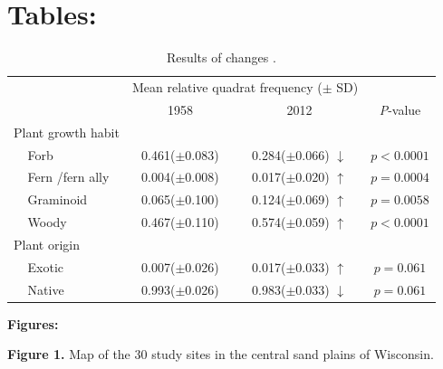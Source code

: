 \clearpage{}
\section*{Tables:}
\vspace{60pt}

\begin{table}[h]
\begin{centering}
\doublespacing\caption{\label{tab:changes-in-rel-frequency}Results of changes .\protect \\
}
\par\end{centering}

\centering{}\doublespacing%
\begin{tabular*}{1\textwidth}{@{\extracolsep{\fill}}clccc}

\toprule
 &  & \multicolumn{2}{c}{Mean relative quadrat frequency ($\pm$ SD)} & \multicolumn{1}{c}{}\tabularnewline
\cline{3-4}
 &  & 1958 & 2012  & \multicolumn{1}{c}{\emph{P}-{\small{}value}}\tabularnewline
\midrule
\multicolumn{2}{l}{Plant growth habit} &  &  & \tabularnewline
 & Forb & 0.461($\pm$0.083) & 0.284($\pm$0.066) $\downarrow$ & $p<0.0001$\tabularnewline
 & Fern /fern ally & 0.004($\pm$0.008) & 0.017($\pm$0.020) $\uparrow$ & $p=0.0004$\tabularnewline
 & Graminoid & 0.065($\pm$0.100) & 0.124($\pm$0.069) $\uparrow$ & $p=0.0058$\tabularnewline
 & Woody & 0.467($\pm$0.110) & 0.574($\pm$0.059) $\uparrow$ & $p<0.0001$\tabularnewline
\multicolumn{2}{l}{Plant origin} &  &  & \tabularnewline
 & Exotic & 0.007($\pm$0.026) & 0.017($\pm$0.033) $\uparrow$ & $p=0.061$\tabularnewline
 & Native & 0.993($\pm$0.026) & 0.983($\pm$0.033) $\downarrow$ & $p=0.061$\tabularnewline
\bottomrule
\end{tabular*}
\end{table}

\clearpage{}

\noindent\textbf{Figures:}

\noindent \textbf{Figure 1.} Map of the 30 study sites in the central
sand plains of Wisconsin.

